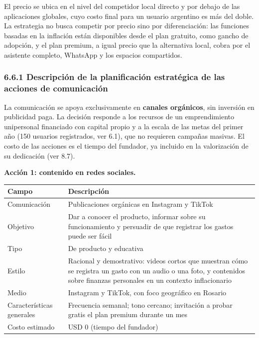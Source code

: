 El precio se ubica en el nivel del competidor local directo y por debajo
de las aplicaciones globales, cuyo costo final para un usuario argentino
es más del doble. La estrategia no busca competir por precio sino por
diferenciación: las funciones basadas en la inflación están disponibles
desde el plan gratuito, como gancho de adopción, y el plan premium, a
igual precio que la alternativa local, cobra por el asistente completo,
WhatsApp y los espacios compartidos.


\subsubsection*{6.6.1 Descripción de la planificación estratégica de las
acciones de
comunicación}\label{descripciuxf3n-de-la-planificaciuxf3n-estratuxe9gica-de-las-acciones-de-comunicaciuxf3n}

La comunicación se apoya exclusivamente en \textbf{canales orgánicos},
sin inversión en publicidad paga. La decisión responde a los recursos de
un emprendimiento unipersonal financiado con capital propio y a la
escala de las metas del primer año (150 usuarios registrados, ver 6.1),
que no requieren campañas masivas. El costo de las acciones es el tiempo
del fundador, ya incluido en la valorización de su dedicación (ver 8.7).

\textbf{Acción 1: contenido en redes sociales.}

{\def\LTcaptype{none} %
\begin{longtable}[]{@{}
  >{\raggedright\arraybackslash}p{}
  >{\raggedright\arraybackslash}p{}@{}}
\toprule\noalign{}
\begin{minipage}[b]{\linewidth}\raggedright
Campo
\end{minipage} & \begin{minipage}[b]{\linewidth}\raggedright
Descripción
\end{minipage} \\
\midrule\noalign{}
\endhead
\bottomrule\noalign{}
\endlastfoot
Comunicación & Publicaciones orgánicas en Instagram y TikTok \\
Objetivo & Dar a conocer el producto, informar sobre su funcionamiento y
persuadir de que registrar los gastos puede ser fácil \\
Tipo & De producto y educativa \\
Estilo & Racional y demostrativo: videos cortos que muestran cómo se
registra un gasto con un audio o una foto, y contenidos sobre finanzas
personales en un contexto inflacionario \\
Medio & Instagram y TikTok, con foco geográfico en Rosario \\
Características generales & Frecuencia semanal; tono cercano; invitación
a probar gratis el plan premium durante un mes \\
Costo estimado & USD 0 (tiempo del fundador) \\
\end{longtable}
}

